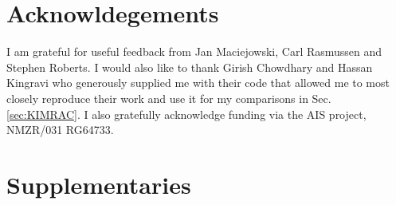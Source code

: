 %
%
%

\section{Acknowldegements}
I am grateful for useful feedback from Jan Maciejowski, Carl Rasmussen and Stephen Roberts. I would also like to thank Girish Chowdhary and Hassan Kingravi who generously supplied me with their code that allowed me to most closely reproduce their work and use it for my comparisons in Sec. \ref{sec:KIMRAC}. I also gratefully acknowledge funding via the AIS project, NMZR/031 RG64733.


\appendix 
\section{Supplementaries}

%
%


